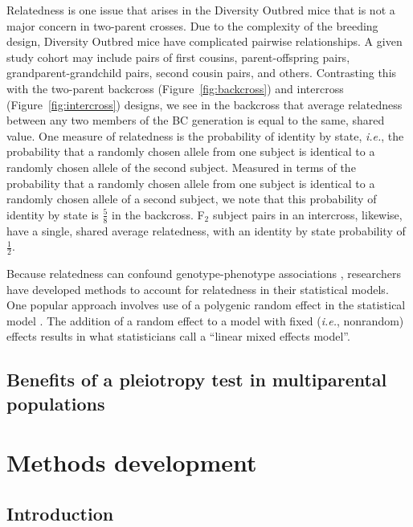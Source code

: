 \documentclass[oneside]{book}\usepackage[]{graphicx}\usepackage[]{color}
\begin{document}
Relatedness is one issue that arises in the Diversity Outbred mice that is not a major concern in 
two-parent crosses. Due to the complexity of the breeding design, Diversity Outbred mice
have 
complicated pairwise relationships. A given study cohort may include pairs of first
cousins, parent-offspring pairs, grandparent-grandchild pairs, second cousin pairs, and others.
Contrasting this with the two-parent backcross (Figure~\ref{fig:backcross}) and
intercross (Figure~\ref{fig:intercross}) designs, we see in the backcross that
average relatedness between any two members of the BC generation is equal to the same, shared value.
One measure of relatedness is the probability of identity by state, \emph{i.e.}, the
probability that a randomly chosen allele from one subject is identical to a randomly chosen
allele of the second subject. Measured in terms of the probability that a randomly chosen allele
from one subject is identical to a randomly chosen allele of a second subject, we note that
this probability of identity by state is $\frac{5}{8}$ in the backcross. F$_2$ subject pairs in an intercross, likewise, have a single, shared average relatedness, with an identity by state probability of $\frac{1}{2}$.

Because relatedness can confound genotype-phenotype associations \citep{yang2014advantages}, researchers have developed methods to account for relatedness in their statistical models. One popular approach involves use of a polygenic random effect in the statistical model \citep{kang2008efficient}. The addition of a random effect to a model with fixed (\emph{i.e.}, nonrandom) effects results in what statisticians call a ``linear mixed effects model''. 

\section{Benefits of a pleiotropy test in multiparental populations}\label{sec:mpp-pleiotropy}








\chapter{Methods development}


\section{Introduction}
\end{document}
